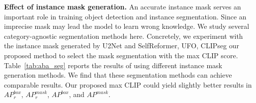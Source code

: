 \documentclass{article}
\begin{document}
\noindent \textbf{Effect of instance mask generation.}
An accurate instance mask serves an important role in training object detection and instance segmentation. Since an imprecise mask may lead the model to learn wrong knowledge. We study several category-agnostic segmentation methods here. Concretely, we experiment with the instance mask generated by U2Net\cite{U2Net} and SelfReformer\cite{selfreformer}, UFO\cite{UFO}, CLIPseg \cite{CLIPseg} our proposed method to select the mask segmentation with the max CLIP score. Table~\ref{tab:aba_seg} reports the results of using different instance mask generation methods. We find that these segmentation methods can achieve comparable results. Our proposed max CLIP could yield slightly better results in $AP_r^{box}$, $AP_r^{mask}$, $AP^{box}$, and $AP^{mask}$.


\begin{table}[t]
  \small
  \centering
\vspace{-2mm}
\caption{Comparison of using different segmentation methods.}
\vspace{-4mm}
\label{tab:aba_seg}
\end{table}
\end{document}
